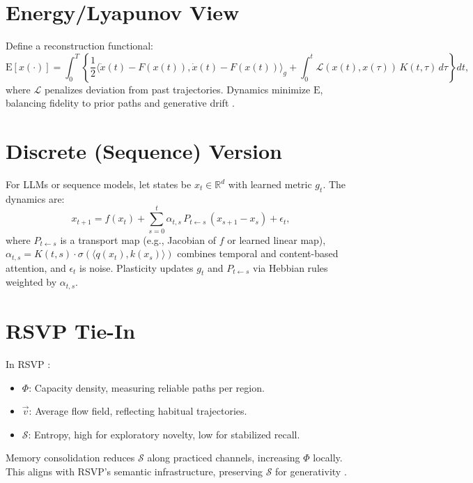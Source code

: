 \documentclass[a4paper,12pt]{article}
\newcommand{\E}{\mathrm{E}}
\newcommand{\Scal}{\mathcal{S}}
\newcommand{\vvec}{\vec{v}}
\begin{document}
\section{Energy/Lyapunov View}
Define a reconstruction functional:
\[
\E[x(\cdot)] = \int_0^T \left\{ \frac{1}{2} \langle \dot{x}(t) - F(x(t)), \dot{x}(t) - F(x(t)) \rangle_g + \int_0^t \mathcal{L}(x(t), x(\tau)) \, K(t,\tau) \, d\tau \right\} dt,
\]
where $\mathcal{L}$ penalizes deviation from past trajectories. Dynamics minimize $\E$, balancing fidelity to prior paths and generative drift \citep{friston2010free}.

\section{Discrete (Sequence) Version}
For LLMs or sequence models, let states be $x_t \in \mathbb{R}^d$ with learned metric $g_t$. The dynamics are:
\[
x_{t+1} = f(x_t) + \sum_{s=0}^t \alpha_{t,s} \, P_{t \leftarrow s} \, (x_{s+1} - x_s) + \epsilon_t,
\]
where $P_{t \leftarrow s}$ is a transport map (e.g., Jacobian of $f$ or learned linear map), $\alpha_{t,s} = K(t,s) \cdot \sigma(\langle q(x_t), k(x_s) \rangle)$ combines temporal and content-based attention, and $\epsilon_t$ is noise. Plasticity updates $g_t$ and $P_{t \leftarrow s}$ via Hebbian rules weighted by $\alpha_{t,s}$.

\section{RSVP Tie-In}
In RSVP \citep{semantic2025}:
\begin{itemize}
    \item $\Phi$: Capacity density, measuring reliable paths per region.
    \item $\vvec$: Average flow field, reflecting habitual trajectories.
    \item $\Scal$: Entropy, high for exploratory novelty, low for stabilized recall.
\end{itemize}
Memory consolidation reduces $\Scal$ along practiced channels, increasing $\Phi$ locally. This aligns with RSVP’s semantic infrastructure, preserving $\Scal$ for generativity \citep{lurie2009higher}.
\end{document}

